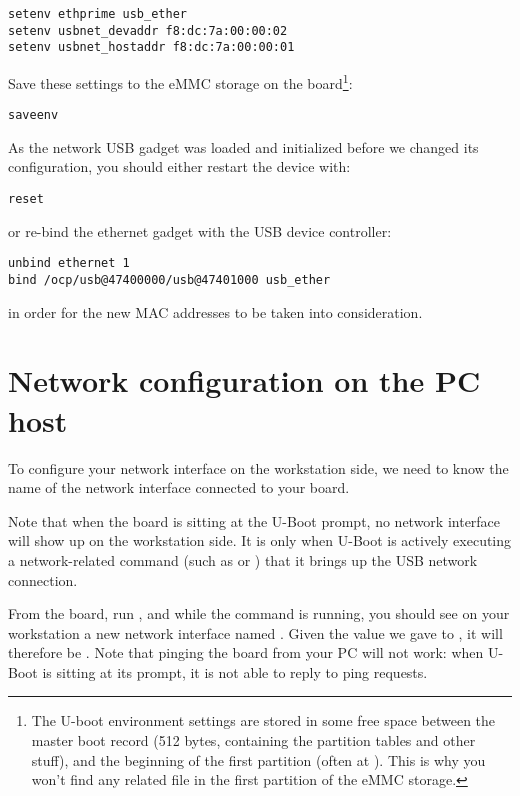 \begin{verbatim}
setenv ethprime usb_ether
setenv usbnet_devaddr f8:dc:7a:00:00:02
setenv usbnet_hostaddr f8:dc:7a:00:00:01
\end{verbatim}

Save these settings to the eMMC storage on the board\footnote{
The U-boot environment settings are stored in some free space
between the master boot record (512 bytes, containing the partition
tables and other stuff), and the beginning of the first partition (often
at ). This is why you won't find any related file in the
first partition of the eMMC storage.}:

\begin{verbatim}
saveenv
\end{verbatim}

As the network USB gadget was loaded and initialized before we changed
its configuration, you should either restart the device with:
\begin{verbatim}
reset
\end{verbatim}
or re-bind the ethernet gadget with the USB device controller:
\begin{verbatim}
unbind ethernet 1
bind /ocp/usb@47400000/usb@47401000 usb_ether
\end{verbatim}
in order for the new MAC addresses to be taken into consideration.

\section{Network configuration on the PC host}

To configure your network interface on the workstation side, we need
to know the name of the network interface connected to your board.

Note that when the board is sitting at the U-Boot prompt, no network
interface will show up on the workstation side. It is only when U-Boot
is actively executing a network-related command (such as 
or ) that it brings up the USB network connection.

From the board, run , and while the 
command is running, you should see on your workstation a new network
interface named . Given the value we gave to
, it will therefore be
. Note that pinging the board from your PC will
not work: when U-Boot is sitting at its prompt, it is not able to
reply to ping requests.

